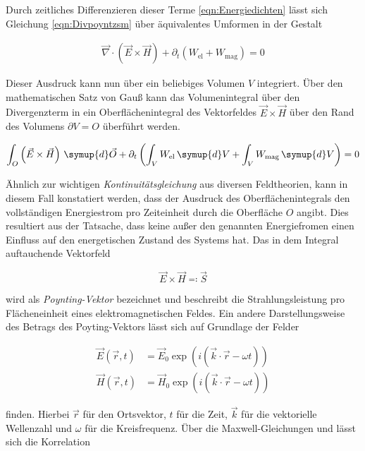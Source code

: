 \noindent Durch zeitliches Differenzieren dieser Terme \eqref{eqn:Energiedichten} lässt sich Gleichung \eqref{eqn:Divpoyntzsm} über äquivalentes Umformen 
in der Gestalt 

\begin{align*}
    \vec{\nabla}\cdot\left(\vec{E}\times\vec{H}\right) + \partial_t\left(W_\text{el}+W_\text{mag}\right) = 0
\end{align*}

\noindent Dieser Ausdruck kann nun über ein beliebiges Volumen $V$ integriert. Über den mathematischen Satz von Gauß kann das Volumenintegral über den 
Divergenzterm in ein Oberflächenintegral des Vektorfeldes $\vec{E}\times\vec{H}$ über den Rand des Volumens $\partial{}V=O$ überführt werden. 

\begin{align}
    \int_O \left(\vec{E}\times\vec{H}\right)\,\symup{d}\vec{O} + \partial_t\left(\int_V W_\text{el}\,\symup{d}V + \int_V W_\text{mag}\,\symup{d}V\right) = 0
\label{eqn:Gauss}
\end{align}

\noindent Ähnlich zur wichtigen \emph{Kontinuitätsgleichung} aus diversen Feldtheorien, kann in diesem Fall konstatiert werden, dass der Ausdruck des Oberflächenintegrals
den vollständigen Energiestrom pro Zeiteinheit durch die Oberfläche $O$ angibt. Dies resultiert aus der Tatsache, dass keine außer den genannten Energiefromen 
einen Einfluss auf den energetischen Zustand des Systems hat. Das in dem Integral auftauchende Vektorfeld 

\begin{equation}
    \vec{E}\times\vec{H} \eqcolon \vec{S}  
\end{equation}

\noindent wird als \emph{Poynting-Vektor} bezeichnet und beschreibt die Strahlungsleistung pro Flächeneinheit eines elektromagnetischen Feldes. Ein andere 
Darstellungsweise des Betrags des Poyting-Vektors lässt sich auf Grundlage der Felder 

\begin{align*}
    \vec{E}(\vec{r},t) &= \vec{E}_0\exp\left(i(\vec{k}\cdot\vec{r}-\omega{}t)\right)\\
    \vec{H}(\vec{r},t) &= \vec{H}_0\exp\left(i(\vec{k}\cdot\vec{r}-\omega{}t)\right)
\end{align*}

\noindent finden. Hierbei $\vec{r}$ für den Ortsvektor, $t$ für die Zeit, $\vec{k}$ für die vektorielle Wellenzahl und $\omega$ für die Kreisfrequenz. Über die Maxwell-Gleichungen 
 und  lässt sich die Korrelation 

